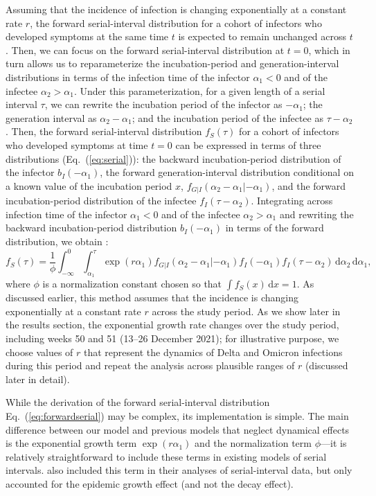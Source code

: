 \documentclass[12pt]{article}
\newcommand{\eref}[1]{Eq.~(\ref{eq:#1})}
\newcommand{\dd}[1]{\ensuremath{\, \mathrm{d}#1}}
\newcommand{\dx}{\dd{x}}
\begin{document}
Assuming that the incidence of infection is changing exponentially at a constant rate $r$, the forward serial-interval distribution for a cohort of infectors who developed symptoms at the same time $t$ is expected to remain unchanged across $t$ \citep{park2021forward}. 
Then, we can focus on the forward serial-interval distribution at $t=0$, which in turn allows us to reparameterize the incubation-period and generation-interval distributions in terms of the infection time of the infector $\alpha_1 < 0$ and of the infectee $\alpha_2 > \alpha_1$. 
Under this parameterization, for a given length of a serial interval $\tau$, we can rewrite the incubation period of the infector as $-\alpha_1$; the generation interval as $\alpha_2 - \alpha_1$; and the incubation period of the infectee as $\tau - \alpha_2$.
Then, the forward serial-interval distribution $f_S(\tau)$ for a cohort of infectors who developed symptoms at time $t = 0$ can be expressed in terms of three distributions (\eref{serial}): the backward incubation-period distribution of the infector $b_I(-\alpha_1)$, the forward generation-interval distribution conditional on a known value of the incubation period $x$, $f_{G|I}(\alpha_2-\alpha_1|-\alpha_1)$, and the forward incubation-period distribution of the infectee $f_I(\tau - \alpha_2)$.
Integrating across infection time of the infector $\alpha_1 < 0$ and of the infectee $\alpha_2 > \alpha_1$ and rewriting the backward incubation-period distribution $b_I(-\alpha_1)$ in terms of the forward distribution, we obtain \citep{park2021forward}:
\begin{equation}
f_S(\tau) = \frac{1}{\phi} \int_{-\infty}^0\int_{\alpha_1}^\tau \exp(r \alpha_1) f_{G|I}(\alpha_2 - \alpha_1|- \alpha_1) f_I(- \alpha_1) f_I(\tau - \alpha_2) \dd \alpha_2 \dd \alpha_1,
\label{eq:forwardserial}
\end{equation}
where $\phi$ is a normalization constant chosen so that $\int f_S(x) \dx = 1$.
As discussed earlier, this method assumes that the incidence is changing exponentially at a constant rate $r$ across the study period.
As we show later in the results section, the exponential growth rate changes over the study period, including weeks 50 and 51 (13--26 December 2021);
for illustrative purpose, we choose values of $r$ that represent the dynamics of Delta and Omicron infections during this period and repeat the analysis across plausible ranges of $r$ (discussed later in detail).

While the derivation of the forward serial-interval distribution \eref{forwardserial} may be complex, its implementation is simple.
The main difference between our model and previous models that neglect dynamical effects \citep{ganyani2020estimating,he2020temporal,zhao2021estimating,hart2022generation} is the exponential growth term $\exp(r \alpha_1)$ and the normalization term $\phi$---it is relatively straightforward to include these terms in existing models of serial intervals.
\cite{ferretti2020quantifying, ferretti2020timing} also included this term in their analyses of serial-interval data, but only accounted for the epidemic growth effect (and not the decay effect).
\end{document}
